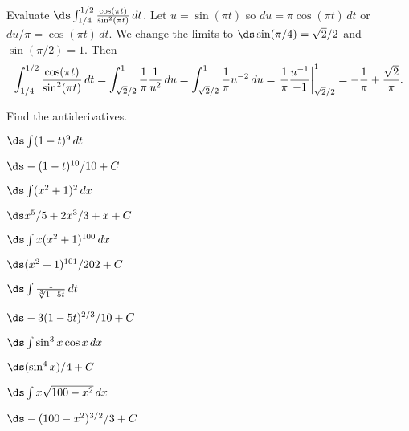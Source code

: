 \begin{example}
Evaluate $\ds\int_{1/4}^{1/2}{\cos(\pi t)\over\sin^2(\pi t)}\,dt$.
Let $u=\sin(\pi t)$ so $du=\pi\cos(\pi t)\,dt$ or $du/\pi=\cos(\pi
t)\,dt$. We change the limits to $\ds \sin(\pi/4)=\sqrt2/2$ and 
$\sin(\pi/2)=1$.
Then
$$
  \int_{1/4}^{1/2}{\cos(\pi t)\over\sin^2(\pi t)}\,dt=
  \int_{\sqrt2/2}^{1}{1\over \pi}{1\over u^2}\,du=
  \int_{\sqrt2/2}^{1} {1\over \pi}u^{-2}\,du=
  \left.{1\over \pi}{u^{-1}\over -1}\right|_{\sqrt2/2}^{1}=
  -{1\over\pi}+{\sqrt2\over\pi}.
$$
\vskip-10pt\end{example}

\begin{exercises}

Find the antiderivatives.


\twocol

\begin{exercise} $\ds\int (1-t)^9\,dt$
\begin{answer} $\ds -(1-t)^{10}/10+C$
\end{answer}\end{exercise}

\begin{exercise} $\ds\int (x^2+1)^2\,dx$
\begin{answer} $\ds x^5/5+2x^3/3+x+C$
\end{answer}\end{exercise}

\begin{exercise} $\ds\int x(x^2+1)^{100}\,dx$
\begin{answer} $\ds (x^2+1)^{101}/202+C$
\end{answer}\end{exercise}

\begin{exercise} $\ds\int {1\over\root 3 \of {1-5t}}\,dt$ 
\begin{answer} $\ds -3(1-5t)^{2/3}/10+C$
\end{answer}\end{exercise}

\begin{exercise} $\ds\int \sin^3x\cos x\,dx$
\begin{answer} $\ds (\sin^4x)/4+C$
\end{answer}\end{exercise}

\begin{exercise} $\ds\int x\sqrt{100-x^2}\,dx$
\begin{answer} $\ds -(100-x^2)^{3/2}/3+C$
\end{answer}\end{exercise}


\end{exercises}
